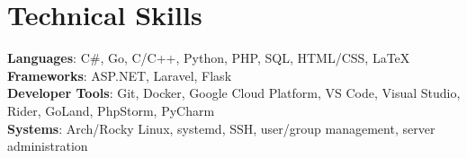 \documentclass[a4paper,11pt]{article}
\begin{document}
%
\section{Technical Skills}
 \begin{itemize}[leftmargin=0.15in, label={}]
    \small{\item{
     \textbf{Languages}{: C\#, Go, C/C++, Python, PHP, SQL, HTML/CSS, \LaTeX} \\
     \textbf{Frameworks}{: ASP.NET, Laravel, Flask} \\
     \textbf{Developer Tools}{: Git, Docker, Google Cloud Platform, VS Code, Visual Studio, Rider, GoLand, PhpStorm, PyCharm} \\
     \textbf{Systems}{: Arch/Rocky Linux, systemd, SSH, user/group management, server administration} \\
    }}
 \end{itemize}


\end{document}
